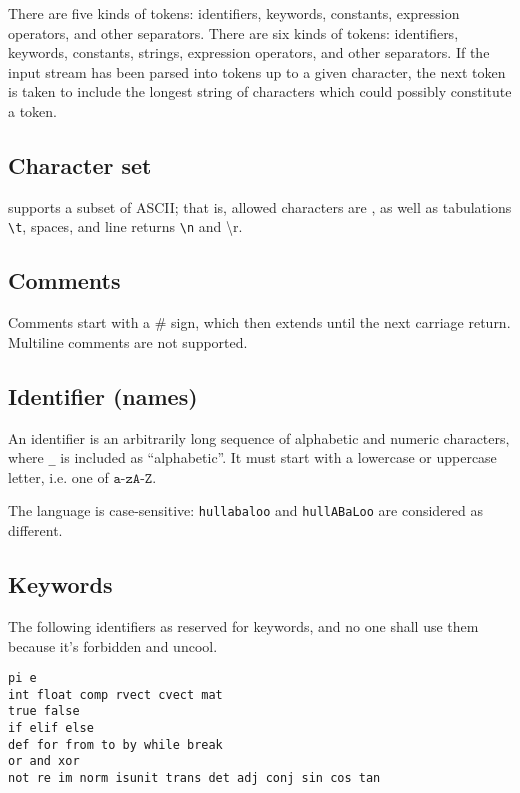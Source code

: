 There are five kinds of tokens: identifiers, keywords, constants, expression operators, and other separators. There are six kinds of tokens: identifiers, keywords, constants, strings, expression operators, and other separators. If the input stream has been parsed into tokens up to a given character, the next token is taken to include the longest string of characters which could possibly constitute a token.

\subsection{Character set}
\QL supports a subset of ASCII; that is, allowed characters are
, as well as tabulations \texttt{\textbackslash{}t}, spaces, and line returns \texttt{\textbackslash{}n} and {\textbackslash{}r}.
\subsection{Comments}
Comments start with a \# sign, which then extends until the next carriage return. Multiline comments are not supported.

\subsection{Identifier (names)}
An identifier is an arbitrarily long sequence of alphabetic and numeric characters, where \texttt{\_} is included as ``alphabetic''. It must start with a lowercase or uppercase letter, i.e. one of $\texttt{a-zA-Z}$.

\noindent The language is case-sensitive: \texttt{hullabaloo} and \texttt{hullABaLoo} are considered as different.

\subsection{Keywords}
The following identifiers as reserved for keywords, and no one shall use them because it's forbidden and uncool.
\begin{verbatim}
pi e
int float comp rvect cvect mat
true false
if elif else
def for from to by while break
or and xor
not re im norm isunit trans det adj conj sin cos tan
\end{verbatim}
